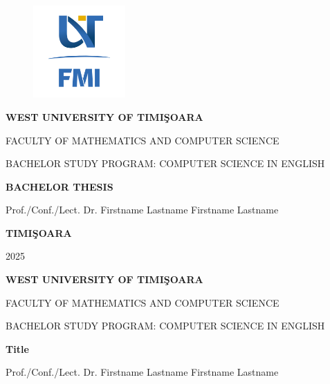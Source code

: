 \documentclass[12pt,a4paper]{book}
\theoremstyle{definition}
\theoremstyle{remark}
\begin{document}
\sloppy

\thispagestyle{empty}
\begin{center}
\begin{figure}[h!]
\vspace{-20pt}
\begin{center}
\includegraphics[width=100pt]{FMI-03.png}
\end{center}
\end{figure}


{\large{\bf WEST UNIVERSITY OF TIMI\c SOARA

FACULTY OF MATHEMATICS AND COMPUTER SCIENCE

BACHELOR STUDY PROGRAM:  COMPUTER SCIENCE IN ENGLISH  
}}

\vspace{120pt}
{\huge {\bf BACHELOR THESIS}}

\vspace{160pt}
\end{center}

{\large{}

\noindent Prof./Conf./Lect. Dr. Firstname Lastname \hfill 
\noindent  Firstname Lastname
}

\vfill
\begin{center}
{\bf TIMI\c SOARA

2025}
\end{center}
\newpage
\thispagestyle{empty}
\begin{center}
{\large{\bf WEST UNIVERSITY OF TIMI\c SOARA
		
FACULTY OF MATHEMATICS AND COMPUTER SCIENCE
		
BACHELOR STUDY PROGRAM:  COMPUTER SCIENCE IN ENGLISH}}

\vspace{200pt}
{\huge {\bf Title }}

\vspace{153pt}
\end{center}

{\large{}

\noindent Prof./Conf./Lect. Dr. Firstname  Lastname\hfill
\noindent Firstname  Lastname}
 
\end{document}
